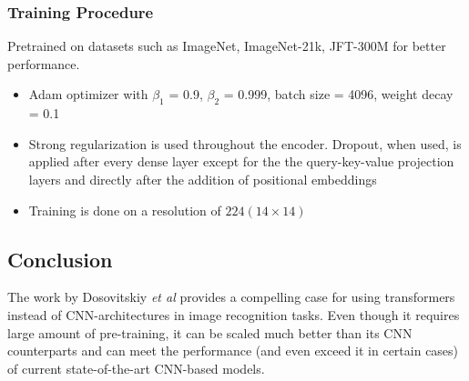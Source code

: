 \subsubsection{Training Procedure}
\par Pretrained on datasets such as ImageNet, ImageNet-21k, JFT-300M for better performance.
\begin{itemize}
	\item Adam optimizer with $\beta_1$ = 0.9, $\beta_2$ = 0.999, batch size = 4096, weight decay = 0.1
	\item Strong regularization is used throughout the encoder. Dropout, when used, is applied after every dense layer except for the the query-key-value projection layers and directly after the addition of positional embeddings
	\item Training is done on a resolution of $224 (14 \times 14)$
\end{itemize}

\subsection{Conclusion}
\par The work by Dosovitskiy \textit{et al} provides a compelling case for using transformers instead of CNN-architectures in image recognition tasks. Even though it requires large amount of pre-training, it can be scaled much better than its CNN counterparts and can meet the performance (and even exceed it in certain cases) of current state-of-the-art CNN-based models.
